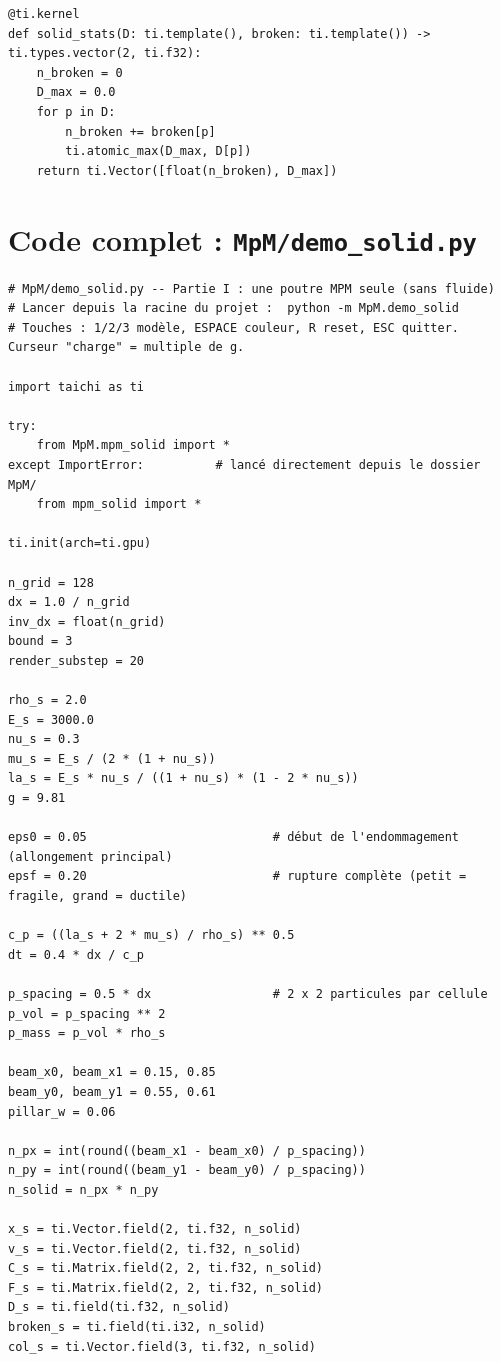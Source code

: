 \documentclass[11pt,a4paper]{article}
\begin{document}
\begin{lstlisting}
@ti.kernel
def solid_stats(D: ti.template(), broken: ti.template()) -> ti.types.vector(2, ti.f32):
    n_broken = 0
    D_max = 0.0
    for p in D:
        n_broken += broken[p]
        ti.atomic_max(D_max, D[p])
    return ti.Vector([float(n_broken), D_max])
\end{lstlisting}

\section{Code complet : \texttt{MpM/demo\_solid.py}}
\label{app:demo}

\begin{lstlisting}
# MpM/demo_solid.py -- Partie I : une poutre MPM seule (sans fluide)
# Lancer depuis la racine du projet :  python -m MpM.demo_solid
# Touches : 1/2/3 modèle, ESPACE couleur, R reset, ESC quitter. Curseur "charge" = multiple de g.

import taichi as ti

try:
    from MpM.mpm_solid import *
except ImportError:          # lancé directement depuis le dossier MpM/
    from mpm_solid import *

ti.init(arch=ti.gpu)

n_grid = 128
dx = 1.0 / n_grid
inv_dx = float(n_grid)
bound = 3
render_substep = 20

rho_s = 2.0
E_s = 3000.0
nu_s = 0.3
mu_s = E_s / (2 * (1 + nu_s))
la_s = E_s * nu_s / ((1 + nu_s) * (1 - 2 * nu_s))
g = 9.81

eps0 = 0.05                          # début de l'endommagement (allongement principal)
epsf = 0.20                          # rupture complète (petit = fragile, grand = ductile)

c_p = ((la_s + 2 * mu_s) / rho_s) ** 0.5
dt = 0.4 * dx / c_p

p_spacing = 0.5 * dx                 # 2 x 2 particules par cellule
p_vol = p_spacing ** 2
p_mass = p_vol * rho_s

beam_x0, beam_x1 = 0.15, 0.85
beam_y0, beam_y1 = 0.55, 0.61
pillar_w = 0.06

n_px = int(round((beam_x1 - beam_x0) / p_spacing))
n_py = int(round((beam_y1 - beam_y0) / p_spacing))
n_solid = n_px * n_py

x_s = ti.Vector.field(2, ti.f32, n_solid)
v_s = ti.Vector.field(2, ti.f32, n_solid)
C_s = ti.Matrix.field(2, 2, ti.f32, n_solid)
F_s = ti.Matrix.field(2, 2, ti.f32, n_solid)
D_s = ti.field(ti.f32, n_solid)
broken_s = ti.field(ti.i32, n_solid)
col_s = ti.Vector.field(3, ti.f32, n_solid)


\end{lstlisting}
\end{document}
